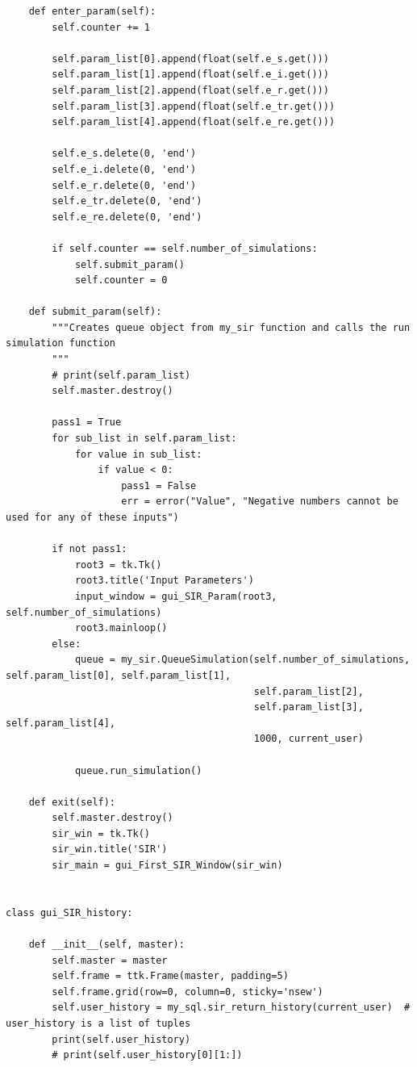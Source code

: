 \documentclass[11pt, a4paper]{article}
\begin{document}
\begin{lstlisting}
    def enter_param(self):
        self.counter += 1

        self.param_list[0].append(float(self.e_s.get()))
        self.param_list[1].append(float(self.e_i.get()))
        self.param_list[2].append(float(self.e_r.get()))
        self.param_list[3].append(float(self.e_tr.get()))
        self.param_list[4].append(float(self.e_re.get()))

        self.e_s.delete(0, 'end')
        self.e_i.delete(0, 'end')
        self.e_r.delete(0, 'end')
        self.e_tr.delete(0, 'end')
        self.e_re.delete(0, 'end')

        if self.counter == self.number_of_simulations:
            self.submit_param()
            self.counter = 0

    def submit_param(self):
        """Creates queue object from my_sir function and calls the run simulation function
        """
        # print(self.param_list)
        self.master.destroy()

        pass1 = True
        for sub_list in self.param_list:
            for value in sub_list:
                if value < 0:
                    pass1 = False
                    err = error("Value", "Negative numbers cannot be used for any of these inputs")

        if not pass1:
            root3 = tk.Tk()
            root3.title('Input Parameters')
            input_window = gui_SIR_Param(root3, self.number_of_simulations)
            root3.mainloop()
        else:
            queue = my_sir.QueueSimulation(self.number_of_simulations, self.param_list[0], self.param_list[1],
                                           self.param_list[2],
                                           self.param_list[3], self.param_list[4],
                                           1000, current_user)

            queue.run_simulation()

    def exit(self):
        self.master.destroy()
        sir_win = tk.Tk()
        sir_win.title('SIR')
        sir_main = gui_First_SIR_Window(sir_win)


class gui_SIR_history:

    def __init__(self, master):
        self.master = master
        self.frame = ttk.Frame(master, padding=5)
        self.frame.grid(row=0, column=0, sticky='nsew')
        self.user_history = my_sql.sir_return_history(current_user)  # user_history is a list of tuples
        print(self.user_history)
        # print(self.user_history[0][1:])


\end{lstlisting}
\end{document}
